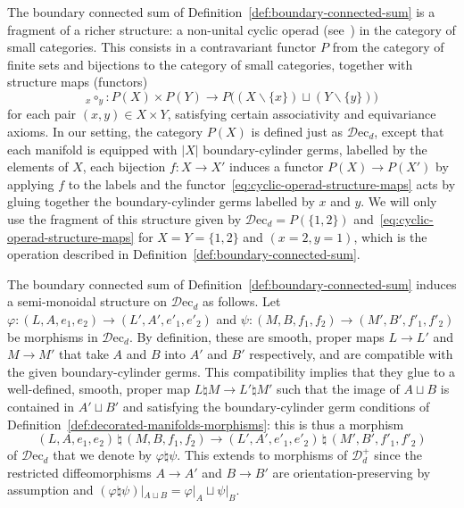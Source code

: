 \documentclass[AHL,Unicode,published]{cedram}
\newcommand{\rec}{\mathrm{ec}}
\newcommand{\cD}{\mathcal{D}}
\newcommand{\too}{\ensuremath{\longrightarrow}}
\begin{document}
\begin{rema}\label{rmk:cyclic-operad-structure}
The boundary connected sum of Definition~\ref{def:boundary-connected-sum} is a fragment of a richer structure: a non-unital cyclic operad (see~\cite{GetzlerKapranov1995}) in the category of small categories. This consists in a contravariant functor $P$ from the category of finite sets and bijections to the category of small categories, together with structure maps (functors)
\begin{equation}\label{eq:cyclic-operad-structure-maps}
{}_x \circ_y \colon P(X) \times P(Y) \too P\big((X \smallsetminus \{x\}) \sqcup (Y \smallsetminus \{y\})\big)
\end{equation}
for each pair $(x,y) \in X \times Y$, satisfying certain associativity and equivariance axioms. In our setting, the category $P(X)$ is defined just as $\cD\rec_d$, except that each manifold is equipped with $| X |$ boundary-cylinder germs, labelled by the elements of $X$, each bijection $f \colon X \to X'$ induces a functor $P(X) \to P(X')$ by applying $f$ to the labels and the functor~\eqref{eq:cyclic-operad-structure-maps} acts by gluing together the boundary-cylinder germs labelled by $x$ and $y$. We will only use the fragment of this structure given by $\cD\rec_d = P(\{1,2\})$ and~\eqref{eq:cyclic-operad-structure-maps} for $X=Y=\{1,2\}$ and $(x=2,y=1)$, which is the operation described in Definition~\ref{def:boundary-connected-sum}.
\end{rema}

The boundary connected sum of Definition~\ref{def:boundary-connected-sum} induces a semi-monoidal structure on $\cD\rec_d$ as follows. Let $\varphi \colon (L,A,e_{1},e_{2}) \to (L',A',e'_{1},e'_{2})$ and $\psi \colon (M,B,f_{1},f_{2}) \to (M',B',f'_{1},f'_{2})$ be morphisms in $\cD\rec_d$. By definition, these are smooth, proper maps $L \to L'$ and $M \to M'$ that take $A$ and $B$ into $A'$ and $B'$ respectively, and are compatible with the given boundary-cylinder germs. This compatibility implies that they glue to a well-defined, smooth, proper map $L \natural M \to L' \natural M'$ such that the image of $A\sqcup B$ is contained in $A'\sqcup B'$ and satisfying the boundary-cylinder germ conditions of Definition~\ref{def:decorated-manifolds-morphisms}: this is thus a morphism
\[
(L,A,e_{1},e_{2}) \,\natural\, (M,B,f_{1},f_{2}) \too (L',A',e'_{1},e'_{2}) \,\natural\, (M',B',f'_{1},f'_{2})
\]
of $\cD\rec_d$ that we denote by $\varphi\natural \psi$. This extends to morphisms of $\cD_{d}^{+}$ since the restricted diffeomorphisms $A\to A'$ and $B\to B'$ are orientation-preserving by assumption and $(\varphi\natural \psi)|_{A \sqcup B} = \varphi|_A \sqcup \psi|_B$.
\end{document}
